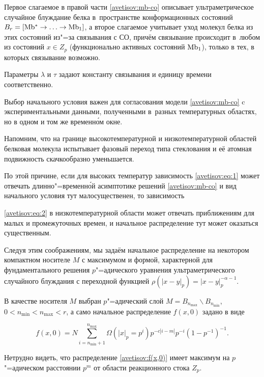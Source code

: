 Первое слагаемое в правой части \eqref{avetisov:mb-co} описывает ультраметрическое случайное блуждание  белка в~пространстве конформационных состояний $B_r=[{\rm Mb^{*}}\to\ldots\to{\rm Mb_{1}}]$, а второе слагаемое учитывает уход молекул белка из этих состояний из"=за связывания с СО, причём связывание происходит в~любом из состояний $x\in Z_{p}$ (функционально активных состояний $\rm Mb_{1}$), только в тех, в которых связывание возможно. 

Параметры $\lambda$ и $\tau$ задают константу связывания и единицу времени соответственно.



Выбор начального условия важен для согласования модели \eqref{avetisov:mb-co} c экспериментальными данными, полученными в~разных температурных областях, но в одном и том же временн\'ом окне. 

Напомним, что на границе высокотемпературной и низкотемпературной областей белковая молекула испытывает фазовый переход типа стеклования и её атомная подвижность скачкообразно уменьшается.  

По этой причине, если для высоких температур зависимость \eqref{avetisov:eq:1} может отвечать длинно"=временн\'ой асимптотике решений \eqref{avetisov:mb-co} и вид начального условия тут малосущественен, то зависимость

\eqref{avetisov:eq:2} в низкотемпературной области может отвечать приближениям для малых и промежуточных времен, и начальное распределение тут может оказаться существенным. 

Следуя этим соображениям, мы задаём начальное распределение на некотором компактном носителе $M$  с максимумом и формой, характерной для фундаментального решения $p$"=адического уравнения ультраметрического случайного блуждания с переходной функцией $\rho(|x-y|_{p})=|x-y|_p^{-\alpha-1}$. 

В качестве носителя $M$ выбран $p$"=адический слой $M=B_{n_{\max}}\backslash B_{n_{\min}}$, $0<n_{\min}<n_{\max}<r$, а само начальное распределение $f(x,0)$ задано в виде

\begin{equation}

f(x,0)=N\sum_{i=n_{\min}+1}^{n_{\max}}\Omega (|x|_{p}=p^{i})p^{-c|i-m|}p^{-i}(1-p^{-1})^{-1}

\label{avetisov:f(x,0)}.

\end{equation}

Нетрудно видеть, что распределение \eqref{avetisov:f(x,0)} имеет максимум на $p$"=адическом расстоянии $p^m$ от области реакционного стока $Z_p$. 

